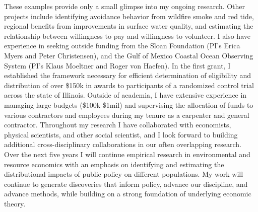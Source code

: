 \documentclass[12pt]{article}
\begin{document}
These examples provide only a small glimpse into my ongoing research. Other projects include identifying avoidance behavior from wildfire smoke and red tide, regional benefits from improvements in surface water quality, and estimating the relationship between willingness to pay and willingness to volunteer. I also have experience in seeking outside funding from the Sloan Foundation (PI's Erica Myers and Peter Christensen), and the Gulf of Mexico Coastal Ocean Observing System (PI's Klaus Moeltner and Roger von Haefen). In the first grant, I established the framework necessary for efficient determination of eligibility and distribution of over \$150k in awards to participants of a randomized control trial across the state of Illinois. Outside of academia, I have extensive experience in managing large budgets (\$100k-\$1mil) and supervising the allocation of funds to various contractors and employees during my tenure as a carpenter and general contractor. Throughout my research I have collaborated with economists, physical scientists, and other social scientist, and I look forward to building additional cross-disciplinary collaborations in our often overlapping research. Over the next five years I will continue empirical research in environmental and resource economics with an emphasis on identifying and estimating the distributional impacts of public policy on different populations. My work will continue to generate discoveries that inform policy, advance our discipline, and advance methods, while building on a strong foundation of underlying economic theory.
\end{document}
